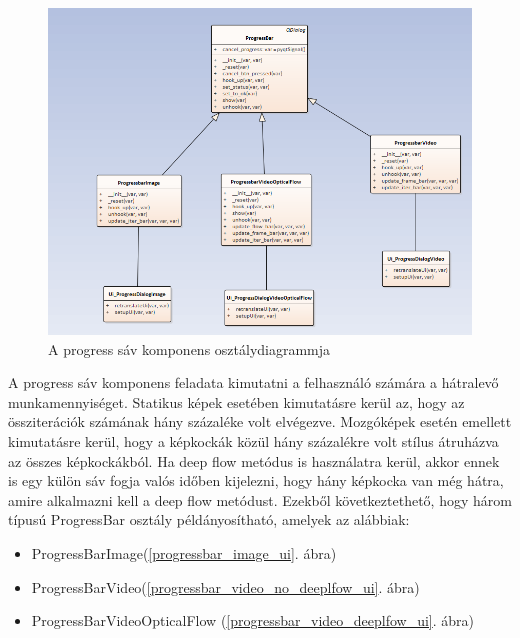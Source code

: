 \documentclass[12pt, a4paper, oneside]{book}
\theoremstyle{tetel}
\begin{document}
\begin{figure}[!htbp]
	\begin{center}
		\includegraphics[scale=0.65]{progressbar.png}
		\caption{A progress sáv komponens osztálydiagrammja}
		\label{progressbar_class}
	\end{center}
\end{figure}

A progress sáv komponens feladata kimutatni a felhasználó számára a hátralevő munkamennyiséget. Statikus képek esetében kimutatásre kerül az, hogy az össziterációk számának hány százaléke volt elvégezve. Mozgóképek esetén emellett kimutatásre kerül, hogy a képkockák közül hány százalékre volt stílus átruházva az összes képkockákból. Ha deep flow metódus is használatra kerül, akkor ennek is egy külön sáv fogja valós időben kijelezni, hogy hány képkocka van még hátra, amire alkalmazni kell a deep flow metódust. Ezekből következtethető, hogy három típusú ProgressBar osztály példányosítható, amelyek az alábbiak:

\begin{itemize}
	\item ProgressBarImage(\ref{progressbar_image_ui}. ábra)
	\item ProgressBarVideo(\ref{progressbar_video_no_deeplfow_ui}. ábra)
	\item ProgressBarVideoOpticalFlow (\ref{progressbar_video_deeplfow_ui}. ábra)
\end{itemize}
\end{document}
